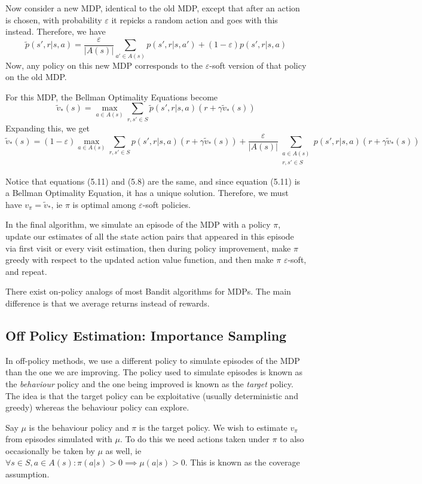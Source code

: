 \documentclass[12pt]{report}
\begin{document}
Now consider a new MDP, identical to the old MDP, except that after an action is chosen, with probability $\varepsilon$ it repicks a random action and goes with this instead. Therefore, we have
\begin{equation}
    \tilde{p}(s', r | s, a) = \frac{\varepsilon}{\left|A(s)\right|} \sum_{a' \in A(s)} p(s', r | s, a') + (1 - \varepsilon) p(s', r | s, a)
\end{equation}
Now, any policy on this new MDP corresponds to the $\varepsilon$-soft version of that policy on the old MDP.

For this MDP, the Bellman Optimality Equations become
\begin{equation}
    \tilde{v}_{*}(s) = \max_{a \in A(s)} \sum_{r, s' \in S} \tilde{p}(s', r | s, a)(r + \gamma \tilde{v}_{*}(s))
\end{equation}
Expanding this, we get
\begin{equation}
    \tilde{v}_{*}(s) = (1 - \varepsilon) \max_{a \in A(s)} \sum_{r, s' \in S} p(s', r | s, a)(r + \gamma \tilde{v}_{*}(s)) + \frac{\varepsilon}{\left|A(s)\right|} \sum_{\substack{a \in A(s)\\r, s' \in S}} p(s', r | s, a)(r + \gamma \tilde{v}_{*}(s))
\end{equation}

Notice that equations (5.11) and (5.8) are the same, and since equation (5.11) is a Bellman Optimality Equation, it has a unique solution. Therefore, we must have $v_{\pi} = \tilde{v}_{*}$, ie $\pi$ is optimal among $\varepsilon$-soft policies.

In the final algorithm, we simulate an episode of the MDP with a policy $\pi$, update our estimates of all the state action pairs that appeared in this episode via first visit or every visit estimation, then during policy improvement, make $\pi$ greedy with respect to the updated action value function, and then make $\pi$ $\varepsilon$-soft, and repeat.

There exist on-policy analogs of most Bandit algorithms for MDPs. The main difference is that we average returns instead of rewards. 

\subsection{Off Policy Estimation: Importance Sampling}
In off-policy methods, we use a different policy to simulate episodes of the MDP than the one we are improving. The policy used to simulate episodes is known as the \textit{behaviour} policy and the one being improved is known as the \textit{target} policy. The idea is that the target policy can be exploitative (usually deterministic and greedy) whereas the behaviour policy can explore.

Say $\mu$ is the behaviour policy and $\pi$ is the target policy. We wish to estimate $v_{\pi}$ from episodes simulated with $\mu$. To do this we need actions taken under $\pi$ to also occasionally be taken by $\mu$ as well, ie $\forall s \in S, a \in A(s): \pi(a | s) > 0 \implies \mu(a | s) > 0$. This is known as the coverage assumption.
\end{document}
